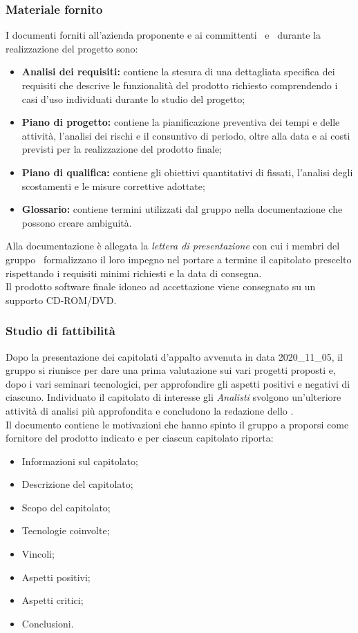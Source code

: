 \subsubsection{Materiale fornito} 
I documenti forniti all'azienda proponente e ai committenti \VT\ e \CR\ durante la realizzazione del progetto sono:
\begin{itemize}
	\item \textbf{Analisi dei requisiti:} contiene la stesura di una dettagliata specifica dei requisiti che descrive le funzionalità del prodotto richiesto comprendendo i casi d'uso individuati durante lo studio del progetto;
	\item \textbf{Piano di progetto:} contiene la pianificazione preventiva dei tempi e delle attività, l’analisi dei rischi e il consuntivo di periodo, oltre alla data e ai costi previsti per la realizzazione del prodotto finale;
	\item \textbf{Piano di qualifica:} contiene gli obiettivi quantitativi di  fissati, l'analisi degli scostamenti e le misure correttive adottate;
	\item \textbf{Glossario:} contiene termini utilizzati dal gruppo nella documentazione che possono creare ambiguità.
\end{itemize}
Alla documentazione è allegata la \textit{lettera di presentazione} con cui i membri del gruppo \Gruppo\ formalizzano il loro impegno nel portare a termine il capitolato prescelto rispettando i requisiti minimi richiesti e la data di consegna.\\
Il prodotto software finale idoneo ad accettazione viene consegnato su un supporto CD-ROM/DVD.

\subsubsection{Studio di fattibilità}\label{SdF}
Dopo la presentazione dei capitolati d'appalto avvenuta in data 2020\_11\_05, il gruppo si riunisce per dare una prima valutazione sui vari progetti proposti e, dopo i vari seminari tecnologici, per approfondire gli aspetti positivi e negativi di ciascuno. Individuato il capitolato di interesse gli \textit{Analisti} svolgono un'ulteriore attività di analisi più approfondita e concludono la redazione dello \SdFv.\\
Il documento contiene le motivazioni che hanno spinto il gruppo a proporsi come fornitore del prodotto indicato e per ciascun capitolato riporta:
\begin{itemize}
\item Informazioni sul capitolato;
\item Descrizione del capitolato;
\item Scopo del capitolato;
\item Tecnologie coinvolte; 
\item Vincoli;
\item Aspetti positivi;
\item Aspetti critici;
\item Conclusioni.
\end{itemize}

